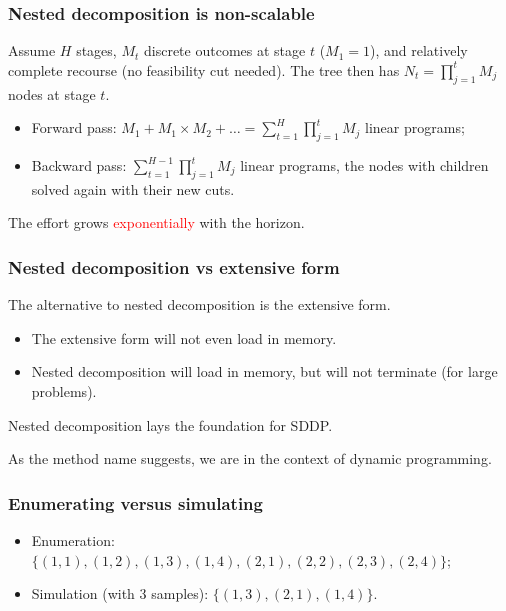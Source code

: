 \documentclass[aspectratio=169]{beamer}
\newcommand{\recombgraph}[2]{%
  \node[nd] (r) at (0,0) {$1$};
  \node[#1] (a1) at (2,1.1)  {$1$};
  \node[#1] (a2) at (2,-1.1) {$2$};
  \node[#2] (b1) at (4,1.65)  {$1$};
  \node[#2] (b2) at (4,0.55)  {$2$};
  \node[#2] (b3) at (4,-0.55) {$3$};
  \node[#2] (b4) at (4,-1.65) {$4$};
  \draw[edg] (r) -- (a1) (r) -- (a2);
  \foreach \a in {a1,a2} \foreach \b in {b1,b2,b3,b4} \draw[edg] (\a) -- (\b);}
\begin{document}
\begin{frame}
\frametitle{Nested decomposition is non-scalable}

Assume $H$ stages, $M_t$ discrete outcomes at stage $t$ ($M_1 = 1$), and relatively complete
recourse (no feasibility cut needed). The tree then has $N_t = \prod_{j=1}^t M_j$ nodes at
stage $t$.

\begin{center}
\end{center}

\begin{small}
\begin{itemize}
	\item
Forward pass: $M_1 + M_1 \times M_2 + \ldots = \sum_{t = 1}^H \prod_{j = 1}^t M_j$ linear programs;
	\item
Backward pass: $\sum_{t = 1}^{H-1} \prod_{j = 1}^t M_j$ linear programs, the nodes with children solved again with their new cuts.
\end{itemize}
The effort grows \textcolor{red}{exponentially} with the horizon.
\end{small}

\end{frame}

\begin{frame}
	\frametitle{Nested decomposition vs extensive form}

	The alternative to nested decomposition is the extensive form.
	\begin{itemize}
		\item
		The extensive form will not even load in memory.
		\item
		Nested decomposition will load in memory, but will not
		terminate (for large problems).
	\end{itemize}

	Nested decomposition lays the foundation for SDDP.

	\mbox{}

	As the method name suggests, we are in the context of dynamic programming.

\end{frame}

\begin{frame}
	\frametitle{Enumerating versus simulating}

\begin{center}
\end{center}

\begin{itemize}
	\item
	Enumeration: $\{(1, 1), (1, 2), (1, 3), (1, 4), (2, 1), (2, 2), (2,
		3), (2, 4)\}$;
	\item
	Simulation (with 3 samples): $\{(1, 3), (2, 1), (1, 4)\}$.
\end{itemize}
\end{frame}
\end{document}
